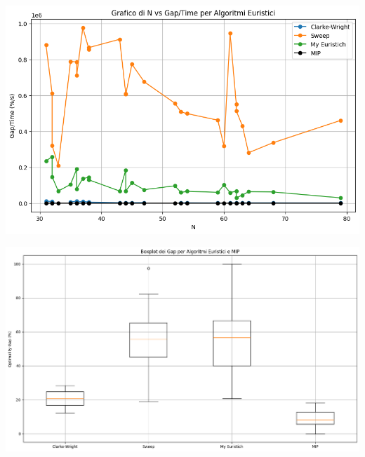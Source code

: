 \documentclass[compress]{beamer}
\begin{document}
\begin{frame}{\subsecname}
    \begin{center}
		\begin{minipage}{1\textwidth}
            \centering
            \includegraphics[width=1\linewidth]{images/N_gap_over_time.png}
        \end{minipage}
    \end{center}
\end{frame}

\begin{frame}{\subsecname}
    \begin{center}
		\begin{minipage}{1\textwidth}
            \centering
            \includegraphics[width=1\linewidth]{images/boxplot_gap.png}
        \end{minipage}
    \end{center}
\end{frame}
\end{document}
